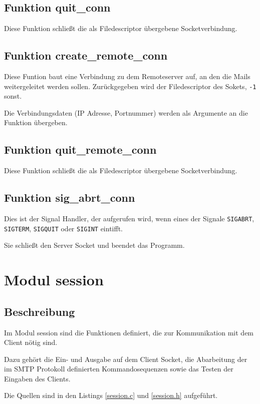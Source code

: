 \documentclass[pdftex,final,a4paper,10pt,notitlepage,halfparskip]{scrreprt}
\begin{document}
\subsection{Funktion quit\_conn}\label{fn:quit_conn}
Diese Funktion schließt die als Filedescriptor übergebene Socketverbindung.


\subsection{Funktion create\_remote\_conn}\label{fn:create_remote_conn}
Diese Funtion baut eine Verbindung zu dem Remoteserver auf, an den die Mails weitergeleitet werden sollen. Zurückgegeben wird der Filedescriptor des Sokets, \texttt{-1} sonst.

Die Verbindungsdaten (IP Adresse, Portnummer) werden als Argumente an die Funktion übergeben.

\subsection{Funktion quit\_remote\_conn}\label{fn:quit_remote_conn}
Diese Funktion schließt die als Filedescriptor übergebene Socketverbindung.

\subsection{Funktion sig\_abrt\_conn}\label{fn:sig_abrt_conn}
Dies ist der Signal Handler, der aufgerufen wird, wenn eines der Signale \texttt{SIGABRT}, \texttt{SIGTERM}, \texttt{SIGQUIT} oder \texttt{SIGINT} eintifft. 

Sie schließt den Server Socket und beendet das Programm.





\section{Modul session}\label{mod:session}
\subsection{Beschreibung}
Im Modul session sind die Funktionen definiert, die zur Kommunikation mit dem Client nötig sind. 

Dazu gehört die Ein- und Ausgabe auf dem Client Socket, die Abarbeitung der im SMTP Protokoll definierten Kommandosequenzen sowie das Testen der Eingaben des Clients.

Die Quellen sind in den Listings \ref{session.c} und \ref{session.h} aufgeführt.
\end{document}
